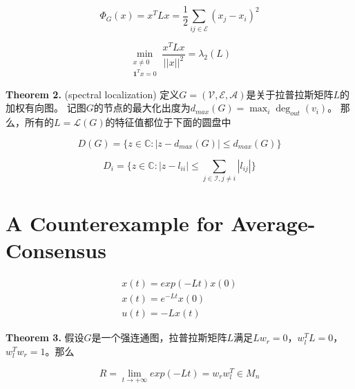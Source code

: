 \documentclass{article}
\begin{document}
\begin{equation}
    \Phi_G(x) = x^T Lx = \frac{1}{2} \sum_{ij\in \mathcal{E}}(x_j - x_i)^2
    \tag{13}
    \label{13}
\end{equation}

\begin{equation}
    \min_{\substack{x\ne 0\\   \mathbf{1}^Tx=0}} \frac{x^T Lx}{||x||^2}=\lambda_2(L)
    \tag{14}
    \label{14}
\end{equation}

\noindent \textbf{Theorem 2.} (spectral localization) 定义$G=(\mathcal{V},\mathcal{E},\mathcal{A})$是关于拉普拉斯矩阵$L$的加权有向图。
记图$G$的节点的最大化出度为$d_{max}(G) = \max_i \deg_{out}(v_i)$。
那么，所有的$L=\mathcal{L}(G)$的特征值都位于下面的圆盘中

\begin{equation}
    D(G) = \{ z\in \mathbb{C}: |z-d_{max}(G)| \le d_{max}(G) \}
    \tag{15}
    \label{15}
\end{equation}

\begin{equation}
    D_i = \{ z\in \mathbb{C}: |z-l_{ii}| \le \sum_{j\in \mathcal{I},j\ne i}|l_{ij}| \}
    \tag{16}
    \label{16}
\end{equation}

\section{A Counterexample for Average-Consensus}


\begin{equation}
    \begin{aligned}
        x(t) = exp(-Lt)x(0)\\
        x(t) = e^{-Lt}x(0)\\
        u(t) = -Lx(t)
    \end{aligned}
    \tag{17}
    \label{17}
\end{equation}

\noindent \textbf{Theorem 3.} 假设$G$是一个强连通图，拉普拉斯矩阵$L$满足$Lw_r=0$，$w_l^TL = 0$，$w_l^Tw_r=1$。那么

\begin{equation}
    R = \lim_{t\rightarrow +\infty} exp(-Lt) = w_r w_l^T \in M_n
    \tag{18}
    \label{18}
\end{equation}

\end{document}
